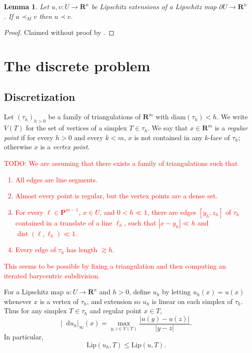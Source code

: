 \documentclass[reqno,11pt]{amsart}
\newcommand{\RR}{\mathbf{R}}
\newcommand{\PP}{\mathbf P}
\newcommand*\dif{\mathop{}\!\mathrm{d}}
\DeclareMathOperator{\dist}{dist}
\newcommand{\diam}{\mathrm{diam}}
\newcommand{\Lip}{\mathrm{Lip}}
\newcommand{\dfn}[1]{\emph{#1}\index{#1}}
\newtheorem{lemma}[theorem]{Lemma}
\theoremstyle{definition}
\numberwithin{equation}{section}
\newcommand\todo[1]{\textcolor{red}{TODO: #1}}
\begin{document}
\begin{lemma}
Let $u, v: U \to \RR^n$ be Lipschitz extensions of a Lipschitz map $\partial U \to \RR^n$.
If $u \prec_M v$ then $u \prec v$.
\end{lemma}
\begin{proof}
Claimed without proof by \cite[\S1.4]{Sheffield12}.
\end{proof}

\section{The discrete problem}
\subsection{Discretization}
Let $(\tau_h)_{h > 0}$ be a family of triangulations of $\RR^m$ with $\diam(\tau_h) < h$.
We write $V(T)$ for the set of vertices of a simplex $T \in \tau_h$.
We say that $x \in \RR^m$ is a \dfn{regular point} if for every $h > 0$ and every $k < m$, $x$ is not contained in any $k$-face of $\tau_h$; otherwise $x$ is a \dfn{vertex point}.

\todo{We are assuming that there exists a family of triangulations such that
\begin{enumerate}
\item All edges are line segments.
\item Almost every point is regular, but the vertex points are a dense set.
\item For every $\ell \in \PP^{m - 1}$, $x \in U$, and $0 < h \ll 1$, there are edges $[y_h, z_h]$ of $\tau_h$ contained in a translate of a line $\ell_h$, such that $|x - y_h| \ll h$ and $\dist(\ell, \ell_h) \ll 1$.
\item Every edge of $\tau_h$ has length $\gtrsim h$.
\end{enumerate}
This seems to be possible by fixing a triangulation and then computing an iterated barycentric subdivision.
}

For a Lipschitz map $u: U \to \RR^n$ and $h > 0$, define $u_h$ by letting $u_h(x) = u(x)$ whenever $x$ is a vertex of $\tau_h$, and extension so $u_h$ is linear on each simplex of $\tau_h$.
Thus for any simplex $T \in \tau_h$ and regular point $x \in T$,
\begin{equation}\label{discrete derivative is vertex lip}
|\dif u_h|_\infty(x) = \max_{y, z \in V(T)} \frac{|u(y) - u(z)|}{|y - z|}.
\end{equation}
In particular,
\begin{equation}\label{discretization contracts lipschitz}
\Lip(u_h, T) \leq \Lip(u, T).
\end{equation}
\end{document}

